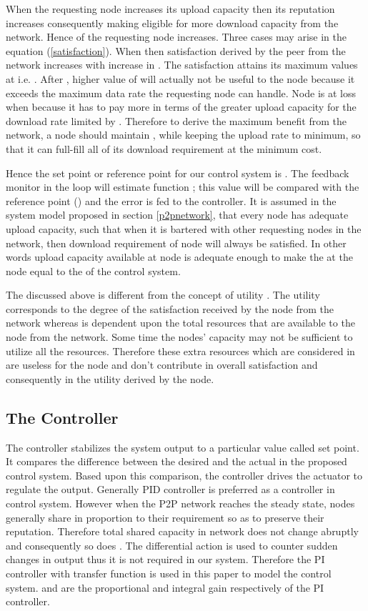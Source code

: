 \documentclass[journal]{IEEEtran}
\begin{document}
When the requesting node  increases its upload capacity then its reputation increases consequently making  eligible for more download capacity  from the network. Hence  of the requesting node increases. Three cases may arise in the equation (\ref{satisfaction}). When  then satisfaction derived by the peer  from the network increases with increase in . The satisfaction attains its maximum values at  i.e. . After , higher value of  will actually not be useful to the node because it exceeds the maximum data rate the requesting node can handle.  Node is at loss when  because it has to pay more in terms of the greater upload capacity for the download rate limited by . Therefore to derive the maximum benefit from the network, a node should maintain , while keeping the upload rate to minimum, so that it can full-fill all of its download requirement at the minimum cost.

Hence the set point or reference point for our control system is . The feedback monitor in the loop will estimate function ; this value will be compared with the reference point () and the error is fed to the controller. It is assumed in the system model proposed in section \ref{p2pnetwork}, that every node  has adequate upload capacity, such that when it is bartered with other requesting nodes in the network, then download requirement of  node  will always be satisfied. In other words upload capacity available  at node  is adequate enough to make the  at the node  equal to the  of the control system.

The  discussed above is different from the concept of utility  \cite{Shenker}. The utility corresponds to the degree of the satisfaction received by the node from the network whereas  is dependent upon the total resources that are available to the node from the network. Some time the nodes' capacity may not be sufficient to utilize all the resources. Therefore these extra resources which are considered in  are useless for the node and don't contribute in overall satisfaction and consequently in the utility derived by the node. 
\subsection{The Controller}
The controller \cite{Ogata} stabilizes the system output to a particular value called set point. It compares the difference between the desired and the actual  in the proposed control system. Based upon this comparison, the controller drives the actuator to regulate the output. Generally PID controller is preferred as a controller in control system. However when the P2P network reaches the steady state, nodes generally share in proportion to their requirement so as to preserve their reputation. Therefore total shared capacity in network does not change abruptly and consequently so does . The differential action is used to counter sudden changes in output thus it is not required in our system. Therefore the PI controller with transfer function  \cite{Ogata} is used  in this paper to model the control system.  and  are  the proportional and integral gain respectively  of the PI controller.
\end{document}
